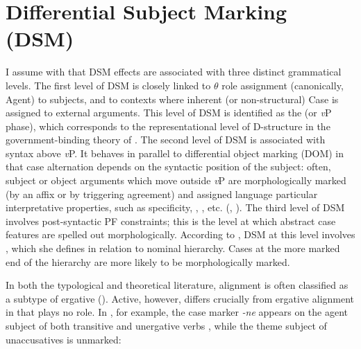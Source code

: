 \documentclass[output=paper]{LSP/langsci}
\begin{document}
\section{Differential Subject Marking (DSM)}\label{14-ya-sec:2}

I assume with \citet{Woolford2008Differential} that DSM effects are associated with three distinct grammatical levels. The first level of DSM is closely linked to \textit{${\theta}$} role assignment (canonically, Agent) to subjects, and to contexts where inherent (or non-structural) Case is assigned to external arguments. This level of DSM is identified as the  (or \textit{v}P phase), which corresponds to the representational level of D-structure in the government-binding theory of \citet{Chomsky1981Lectures}. The second level of DSM is associated with syntax above \textit{v}P. It behaves in parallel to differential object marking (DOM) in that case alternation depends on the syntactic position of the subject: often, subject or object arguments which move outside \textit{v}P are morphologically marked (by an affix or by triggering agreement) and assigned language particular interpretative properties, such as specificity, , , etc. (\cf \citealt{Diesing1992Indefinites}, \citealt{Chomsky2001Minimalist}). The third level of DSM involves post-syntactic PF constraints; this is the level at which abstract case features are spelled out morphologically. According to \citet{Woolford2008Differential}, DSM at this level involves , which she defines in relation to  \citeyear{Silverstein1976Hierarchy} nominal hierarchy. Cases at the more marked end of the hierarchy are more likely to be morphologically marked. 

In both the typological and theoretical literature,  alignment is often classified as a subtype of ergative (\cf \citealt{Comrie1973Ergative,Comrie1978Ergativity,Silverstein1976Hierarchy,Bittneretal1996Structural}). Active, however, differs crucially from ergative alignment in that  plays no role. In , for example, the case marker \textit{-ne} appears on the agent subject of both transitive  and unergative  verbs , while the theme subject of unaccusatives  is unmarked:
\end{document}
